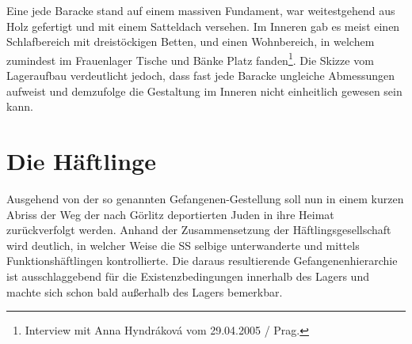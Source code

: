 
Eine jede Baracke stand auf einem massiven Fundament, war weitestgehend aus Holz gefertigt und mit einem Satteldach versehen. Im Inneren gab es meist einen Schlafbereich mit dreistöckigen Betten, und einen Wohnbereich, in welchem zumindest im Frauenlager Tische und Bänke Platz fanden\footnote{Interview mit Anna Hyndr\'akov\'a vom 29.04.2005 / Prag.}. Die Skizze vom Lageraufbau verdeutlicht jedoch, dass fast jede Baracke ungleiche Abmessungen aufweist und demzufolge die Gestaltung im Inneren nicht einheitlich gewesen sein kann.


\section{Die Häftlinge}
Ausgehend von der so genannten Gefangenen-Gestellung soll nun in einem kurzen Abriss der Weg der nach Görlitz deportierten Juden in ihre Heimat zurückverfolgt werden. Anhand der Zusammensetzung der Häftlingsgesellschaft wird deutlich, in welcher Weise die SS selbige unterwanderte und mittels Funktionshäftlingen kontrollierte. Die daraus resultierende Gefangenenhierarchie ist ausschlaggebend für die Existenzbedingungen innerhalb des Lagers und machte sich schon bald außerhalb des Lagers bemerkbar.

